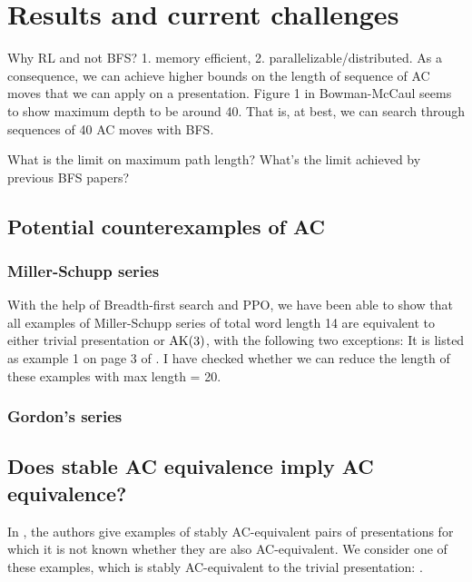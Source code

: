 
\section{Results and current challenges}

Why RL and not BFS? 1. memory efficient, 2. parallelizable/distributed.
As a consequence,  we can achieve higher bounds on the length of sequence of AC moves that we can apply on a presentation.
Figure 1 in Bowman-McCaul seems to show maximum depth to be around 40.
That is, at best, we can search through sequences of 40 AC moves with BFS.

What is the limit on maximum path length? What's the limit achieved by previous BFS papers?

\subsection{Potential counterexamples of AC}

\subsubsection{Miller-Schupp series}

With the help of Breadth-first search and PPO, we have been able to show that all examples of Miller-Schupp series of total word length 14 are equivalent to either trivial presentation or $\text{AK}(3)$, with the following two exceptions:
\bea
{}
\eea
It is listed as example 1 on page 3 of \cite{MMS}.
I have checked whether we can reduce the length of these examples with max length = 20.


\subsubsection{Gordon's series}


\subsection{Does stable AC equivalence imply AC equivalence?}

In \cite{MMS}, the authors give examples of stably AC-equivalent pairs of presentations for which it is not known whether they are also AC-equivalent.
We consider one of these examples, which is stably AC-equivalent to the trivial presentation:
\bea
{}.
\eea

